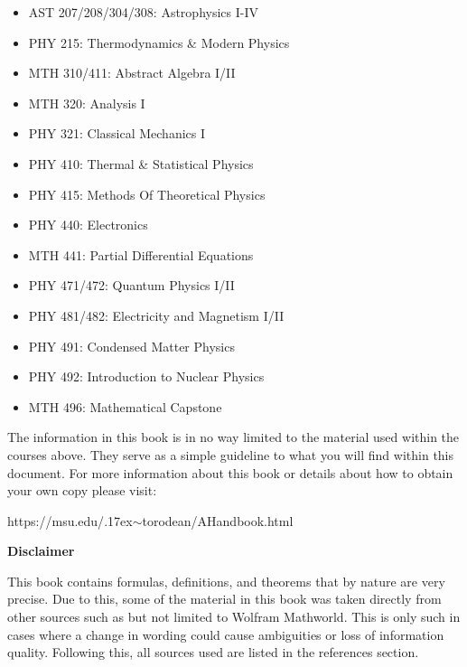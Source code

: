 \begin{multicols}{2}
\begin{itemize}
	\item AST 207/208/304/308: Astrophysics I-IV
	\item PHY 215: Thermodynamics \& Modern Physics
	\item MTH 310/411: Abstract Algebra I/II
	\item MTH 320: Analysis I
	\item PHY 321: Classical Mechanics I
	\item PHY 410: Thermal \& Statistical Physics
	\item PHY 415: Methods Of Theoretical Physics
	\item PHY 440: Electronics
	\item MTH 441: Partial Differential Equations
	\item PHY 471/472: Quantum Physics I/II
	\item PHY 481/482: Electricity and Magnetism I/II
	\item PHY 491: Condensed Matter Physics
	\item PHY 492: Introduction to Nuclear Physics
	\item MTH 496: Mathematical Capstone
\end{itemize} 
\end{multicols}

The information in this book is in no way limited to the material used within the courses above. They serve as a simple guideline to what you will find within this document. For more information about this book or details about how to obtain your own copy please visit:
\begin{center}
	https://msu.edu/{\raise.17ex\hbox{$\scriptstyle\sim$}}torodean/AHandbook.html
\end{center}
\begin{center}
	\textbf{Disclaimer}
\end{center}

This book contains formulas, definitions, and theorems that by nature are very precise. Due to this, some of the material in this book was taken directly from other sources such as but not limited to Wolfram Mathworld. This is only such in cases where a change in wording could cause ambiguities or loss of information quality.  Following this, all sources used are listed in the references section.